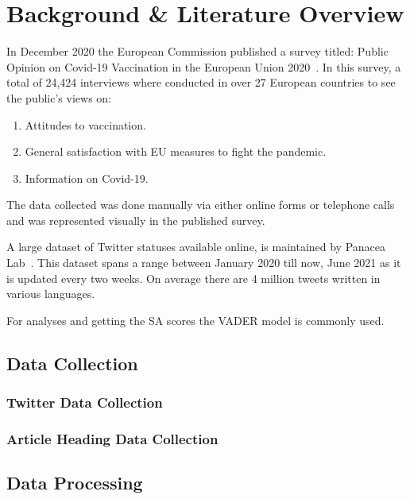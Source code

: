 \chapter{Background \& Literature Overview}

In December 2020 the European Commission published a survey titled: Public Opinion on Covid-19 Vaccination in the European Union 2020~\citep{eupublicopinion}.
In this survey, a total of 24,424 interviews where conducted in over 27 European countries to see the public's views on:

\begin{enumerate}
  \item Attitudes to vaccination.
  \item General satisfaction with EU measures to fight the pandemic.
  \item Information on Covid-19.
\end{enumerate}
\noindent The data collected was done manually via either online forms or telephone calls and was represented visually in the published survey.

A large dataset of Twitter statuses available online, is maintained by Panacea Lab~\citep{banda2020largescale}.
This dataset spans a range between January 2020 till now, June 2021 as it is updated every two weeks.
On average there are 4 million tweets written in various languages.

For analyses and getting the \ac{SA} scores the \ac{VADER} model is commonly used.

\section{Data Collection}
\blindtext
\subsection{Twitter Data Collection}
\blindtext
\subsection{Article Heading Data Collection}
\blindtext
{}

\section{Data Processing}
\blindtext
